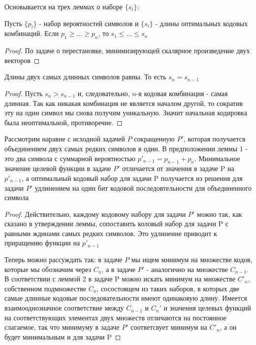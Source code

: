 \documentclass[discrete.tex]{subfiles}
\begin{document}
  \begin{sol}
    Основывается на трех леммах о наборе $\{s_i\}$:
    \begin{lemma}[1]
      Пусть $\{p_i\}$ - набор вероятностей символов и $\{s_i\}$ - длины оптимальных кодовых комбинаций. Если $p_1 \geq ... \geq p_n$, то $s_1 \leq ... \leq s_n$
    \end{lemma}

    \begin{proof}
      По задаче о перестановке, минимизирующей скалярное произведение двух векторов
    \end{proof}

    \begin{lemma}[2]
      Длины двух самых длинных символов равны. То есть $s_n = s_{n-1}$
    \end{lemma}

    \begin{proof}
      Пусть $s_n > s_{n-1}$ и, следовательно, $n$-я кодовая комбинация - самая длинная. Так как никакая комбинация не является началом другой, то сократив эту на один символ мы снова получим уникальную. Значит начальная кодировка была неоптимальной, противоречие.
    \end{proof}

    \begin{lemma}[3]
      Рассмотрим наравне с исходной задачей $P$ сокращенную $P'$,  которая получается объединением двух самых редких символов в один. В предположении леммы 1 - это два символа с суммарной вероятностью $p'_{n-1} = p_{n-1} + p_n$. Минимальное значение целевой функции в задаче $P'$ отличается от значения в задаче P на $p'_{n-1}$, а оптимальный кодовый набор для задачи P получается из решения для задачи $P'$ удлинением на один бит кодовой последовтельности для объединенного символа
    \end{lemma}

    \begin{proof}
      Действительно, каждому кодовому набору для задачи $P'$ можно так, как сказано в утверждении леммы, сопоставить коловый набор для задачи P с равными ждинами самых редких символов. Это удлинение приводит к приращению функции на $p'_{n-1}$

      Теперь можно рассуждать так: в задаче $P$ мы ищем минимум на множестве кодов, которые мы обозначим через $C_n$, а в задаче $P'$ - аналогично на множестве $C_{n-1}$. В соответствии с леммой 2 в задаче P можно искать минимум на множестве $C'_n$, собственном подмножестве $C_n$, сосостоящем из таких наборов, в которых две самые длинные кодовые последовательности имеют одинаковую длину. Имеется взаимооднозначное соответствие между $C_{n-1}$ и $C_n'$ и значения целевых функций на соответствующих элементах двух множеств отличаются на постоянное слагаемое, так что минимуму в задаче $P'$ соответсвует минимум на $C'_n$, а он будет минимальным и для задачи P
    \end{proof}


\end{sol}
\end{document}
